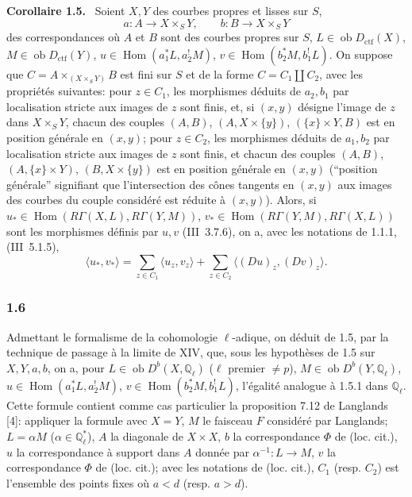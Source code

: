 \documentclass[11pt]{article}
\newenvironment{statement}[1]{\par\medskip\noindent\textbf{#1.}\ }{\par\medskip}
\DeclareMathOperator{\Hom}{Hom}
\newcommand{\ob}{\operatorname{ob}}
\providecommand{\ctf}{\mathrm{ctf}}
\providecommand{\Hom}{\operatorname{Hom}}
\providecommand{\ob}{\operatorname{ob}}
\begin{document}
\begin{statement}{Corollaire 1.5}
Soient $X,Y$ des courbes propres et lisses sur $S$,
\[
a:A\longrightarrow X\times_S Y,
\qquad
b:B\longrightarrow X\times_S Y
\]
des correspondances où $A$ et $B$ sont des courbes propres sur $S$, $L\in\ob D_{\ctf}(X)$, $M\in\ob D_{\ctf}(Y)$, $u\in\Hom(a_1^*L,a_2^!M)$, $v\in\Hom(b_2^*M,b_1^!L)$. On suppose que $C=A\times_{(X\times_S Y)}B$ est fini sur $S$ et de la forme $C=C_1\amalg C_2$, avec les propriétés suivantes: pour $z\in C_1$, les morphismes déduits de $a_2,b_1$ par localisation stricte aux images de $z$ sont finis, et, si $(x,y)$ désigne l'image de $z$ dans $X\times_S Y$, chacun des couples $(A,B)$, $(A,X\times\{y\})$, $(\{x\}\times Y,B)$ est en position générale en $(x,y)$; pour $z\in C_2$, les morphismes déduits de $a_1,b_2$ par localisation stricte aux images de $z$ sont finis, et chacun des couples $(A,B)$, $(A,\{x\}\times Y)$, $(B,X\times\{y\})$ est en position générale en $(x,y)$ (``position générale'' signifiant que l'intersection des cônes tangents en $(x,y)$ aux images des courbes du couple considéré est réduite à $(x,y)$). Alors, si $u_*\in\Hom(R\Gamma(X,L),R\Gamma(Y,M))$, $v_*\in\Hom(R\Gamma(Y,M),R\Gamma(X,L))$ sont les morphismes définis par $u,v$ (III~3.7.6), on a, avec les notations de 1.1.1, (III~5.1.5),
\begin{equation}\tag{1.5.1}
\langle u_*,v_*\rangle=\sum_{z\in C_1}\langle u_z,v_z\rangle+\sum_{z\in C_2}\langle (Du)_z,(Dv)_z\rangle.
\end{equation}
\end{statement}

\subsubsection*{1.6}
Admettant le formalisme de la cohomologie $\ell$-adique, on déduit de 1.5, par la technique de passage à la limite de XIV, que, sous les hypothèses de 1.5 sur $X,Y,a,b$, on a, pour $L\in\ob D^b(X,\mathbb Q_\ell)$ ($\ell$ premier $\ne p$), $M\in\ob D^b(Y,\mathbb Q_\ell)$, $u\in\Hom(a_1^*L,a_2^!M)$, $v\in\Hom(b_2^*M,b_1^!L)$, l'égalité analogue à 1.5.1 dans $\mathbb Q_\ell$. Cette formule contient comme cas particulier la proposition 7.12 de Langlands [4]: appliquer la formule avec $X=Y$, $M$ le faisceau $F$ considéré par Langlands; $L=\alpha M$ ($\alpha\in\mathbb Q_\ell^*$), $A$ la diagonale de $X\times X$, $b$ la correspondance $\Phi$ de (loc. cit.), $u$ la correspondance à support dans $A$ donnée par $\alpha^{-1}:L\to M$, $v$ la correspondance $\Phi$ de (loc. cit.); avec les notations de (loc. cit.), $C_1$ (resp. $C_2$) est l'ensemble des points fixes où $a<d$ (resp. $a>d$).
\end{document}
